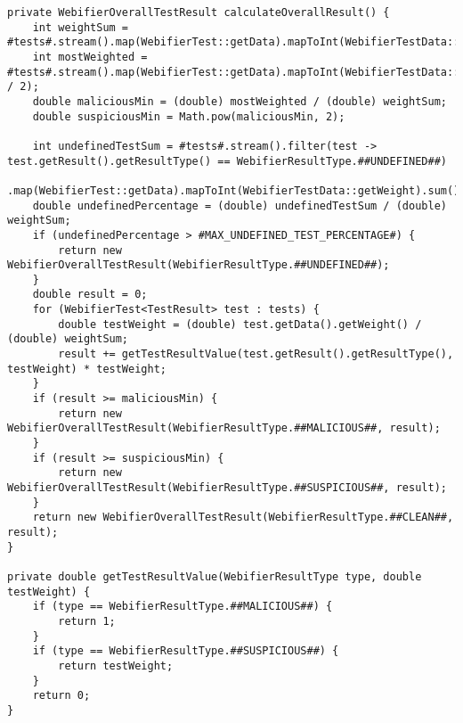 \begin{scriptsize}
\begin{lstlisting}
private WebifierOverallTestResult calculateOverallResult() {
    int weightSum = #tests#.stream().map(WebifierTest::getData).mapToInt(WebifierTestData::getWeight).sum();
    int mostWeighted = #tests#.stream().map(WebifierTest::getData).mapToInt(WebifierTestData::getWeight).max().orElse(weightSum / 2);
    double maliciousMin = (double) mostWeighted / (double) weightSum;
    double suspiciousMin = Math.pow(maliciousMin, 2);

    int undefinedTestSum = #tests#.stream().filter(test -> test.getResult().getResultType() == WebifierResultType.##UNDEFINED##)
            .map(WebifierTest::getData).mapToInt(WebifierTestData::getWeight).sum();
    double undefinedPercentage = (double) undefinedTestSum / (double) weightSum;
    if (undefinedPercentage > #MAX_UNDEFINED_TEST_PERCENTAGE#) {
        return new WebifierOverallTestResult(WebifierResultType.##UNDEFINED##);
    }
    double result = 0;
    for (WebifierTest<TestResult> test : tests) {
        double testWeight = (double) test.getData().getWeight() / (double) weightSum;
        result += getTestResultValue(test.getResult().getResultType(), testWeight) * testWeight;
    }
    if (result >= maliciousMin) {
        return new WebifierOverallTestResult(WebifierResultType.##MALICIOUS##, result);
    }
    if (result >= suspiciousMin) {
        return new WebifierOverallTestResult(WebifierResultType.##SUSPICIOUS##, result);
    }
    return new WebifierOverallTestResult(WebifierResultType.##CLEAN##, result);
}

private double getTestResultValue(WebifierResultType type, double testWeight) {
    if (type == WebifierResultType.##MALICIOUS##) {
        return 1;
    }
    if (type == WebifierResultType.##SUSPICIOUS##) {
        return testWeight;
    }
    return 0;
}
\end{lstlisting}
\end{scriptsize}